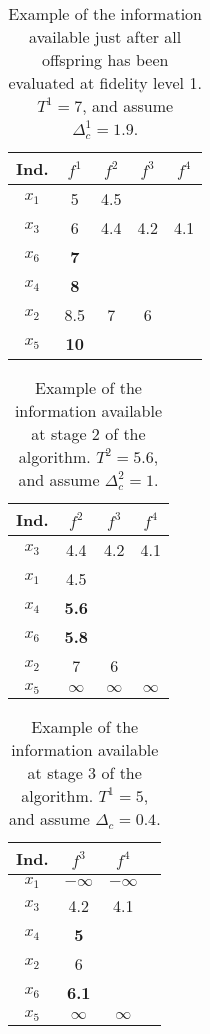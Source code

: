\begin{table}
	\caption{Example of the information available just after all offspring has been evaluated at fidelity level 1. $T^1=7$, and assume $\Delta_c^1=1.9$. \label{tab:ex1}}
	\begin{center}
		\begin{tabular}{c|cccc}
			Ind.&$f^1$&$f^2$&$f^3$&$f^4$\\ \hline
			$x_1$&5&4.5&&\\
			$x_3$&6&4.4&4.2&4.1\\
			$x_6$&{\bf 7}&&&\\
			$x_4$&{\bf 8}&&&\\
			$x_2$&8.5&7&6&\\
			$x_5$&{\bf 10}&&&\\
		\end{tabular}
	\end{center}
\end{table}

\begin{table}
	\caption{Example of the information available at stage 2 of the algorithm. $T^2=5.6$, and assume $\Delta_c^2=1$. \label{tab:ex2}}
	\begin{center}
		\begin{tabular}{c|ccc}
			Ind.&$f^2$&$f^3$&$f^4$\\ \hline
			$x_3$&4.4&4.2&4.1\\
			$x_1$&4.5&&\\
			$x_4$&{\bf 5.6}&&\\
			$x_6$&{\bf 5.8}&&\\
			$x_2$&7&6&\\
			$x_5$&$\infty$&$\infty$&$\infty$\\
		\end{tabular}
	\end{center}
\end{table}

\begin{table}
	\caption{Example of the information available at stage 3 of the algorithm. $T^1=5$, and assume $\Delta_c=0.4$. \label{tab:ex3}}
	\begin{center}
		\begin{tabular}{c|ccc}
			Ind.&$f^3$&$f^4$\\ \hline
			$x_1$&$-\infty$&$-\infty$\\
			$x_3$&4.2&4.1\\
			$x_4$&{\bf 5}&\\
			$x_2$&6&\\
			$x_6$&{\bf 6.1}&\\
			$x_5$&$\infty$&$\infty$\\
		\end{tabular}
	\end{center}
\end{table}

